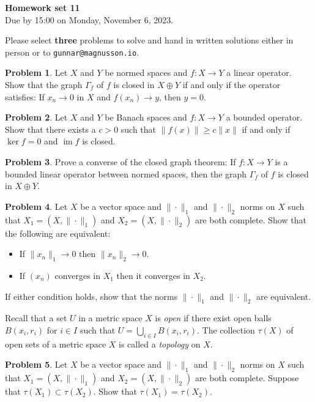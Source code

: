 \documentclass[11pt]{article}
\theoremstyle{definition}
\newtheorem{prob}{Problem}
\DeclareMathOperator{\im}{im}
\def\head{
	\begin{center}
		\textbf{\LARGE Homework set 11}
		\\[3pt]
		Due by 15:00 on Monday, November 6, 2023.
	\end{center}
	\medskip
}
\begin{document}
\head

Please select \textbf{three} problems to solve and hand in written solutions
either in person or to \verb+gunnar@magnusson.io+.

\begin{prob}
	Let $X$ and $Y$ be normed spaces and $f : X \to Y$ a linear operator.
	Show that the graph $\Gamma_f$ of $f$ is closed in $X \oplus Y$ if and only if the operator satisfies: If $x_n \to 0$ in $X$ and $f(x_n) \to y$, then $y = 0$.
\end{prob}

\begin{prob}
	Let $X$ and $Y$ be Banach spaces and $f : X \to Y$ a bounded operator.
	Show that there exists a $c > 0$ such that $\| f(x) \| \geq c \| x \|$
	if and only if $\ker f = 0$ and $\im f$ is closed.
\end{prob}

\begin{prob}
	Prove a converse of the closed graph theorem:
	If $f : X \to Y$ is a bounded linear operator between normed spaces,
	then the graph $\Gamma_f$ of $f$ is closed in $X \oplus Y$.
\end{prob}

\begin{prob}
	Let $X$ be a vector space and $\|\cdot\|_1$ and $\|\cdot\|_2$ norms on $X$
	such that $X_1 = (X, \| \cdot \|_1)$ and $X_2 = (X, \|\cdot\|_2)$ are both complete.
	Show that the following are equivalent:
	\begin{itemize}
		\item
			If $\| x_n \|_1 \to 0$ then $\| x_n \|_2 \to 0$.
		\item
			If $(x_n)$ converges in $X_1$ then it converges in $X_2$.
	\end{itemize}
	If either condition holds, show that the norms $\| \cdot \|_1$ and $\| \cdot \|_2$ are equivalent.
\end{prob}

Recall that a set $U$ in a metric space $X$ is \emph{open} if there exist open
balls $B(x_i, r_i)$ for $i \in I$ such that $U = \bigcup_{i \in I} B(x_i, r_i)$.
The collection $\tau(X)$ of open sets of a metric space $X$ is called a
\emph{topology} on $X$.

\begin{prob}
	Let $X$ be a vector space and $\|\cdot\|_1$ and $\|\cdot\|_2$ norms on $X$
	such that $X_1 = (X, \| \cdot \|_1)$ and $X_2 = (X, \|\cdot\|_2)$ are both complete.
	Suppose that $\tau(X_1) \subset \tau(X_2)$.
	Show that $\tau(X_1) = \tau(X_2)$.
\end{prob}
\end{document}
